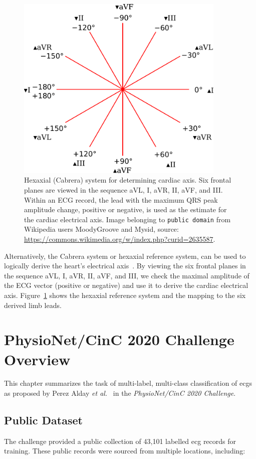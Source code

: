 \documentclass[\main/thesis.tex]{subfiles}
\begin{document}
\begin{figure}
    \centering
    \includegraphics[width=10cm]{figure/Hexaxial_reference_system.pdf}
    \caption{Hexaxial (Cabrera) system for determining cardiac axis. Six frontal planes are viewed in the sequence aVL, I, aVR, II, aVF, and III. Within an ECG record, the lead with the maximum QRS peak amplitude change, positive or negative, is used as the estimate for the cardiac electrical axis.
    Image belonging to \texttt{public domain} from Wikipedia users MoodyGroove and Mysid, source: \url{https://commons.wikimedia.org/w/index.php?curid=2635587}.
    }
    \label{fig:hexaxial_reference}
\end{figure}

Alternatively, the Cabrera system or hexaxial reference system, can be used to logically derive the heart's electrical axis~\cite{lam_classical_2015}.
By viewing the six frontal planes in the sequence aVL, I, aVR, II, aVF, and III, we check the maximal amplitude of the ECG vector (positive or negative) and use it to derive the cardiac electrical axis.
Figure~\ref{fig:hexaxial_reference} shows the hexaxial reference system and the mapping to the six derived limb leads.

\section{PhysioNet/CinC 2020 Challenge Overview}

This chapter summarizes the task of multi-label, multi-class classification of \gls{ecg}s as proposed by Perez Alday \emph{et al.}~\cite{physionet_challenge_2020} in the \emph{PhysioNet/CinC 2020 Challenge}.

\subsection{Public Dataset}
The challenge provided a public collection of 43,101 labelled \gls{ecg} records for training.
These public records were sourced from multiple locations, including:
\end{document}
